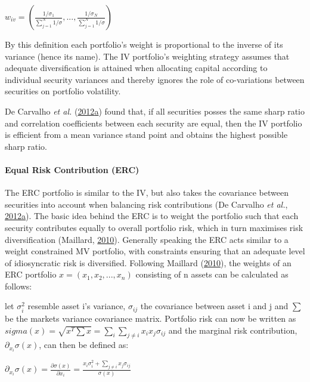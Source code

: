 \documentclass[11pt,preprint, authoryear]{elsarticle}
\numberwithin{equation}{section}
\numberwithin{figure}{section}
\numberwithin{table}{section}
\begin{document}
\begin{center} 
$w_{iv}=(\frac{1/\sigma_1}{\sum^N_{j=1} 1/\sigma}, ...,\frac{1/\sigma_N}{\sum^N_{j=1} 1/\sigma} )$ 
\end{center}

By this definition each portfolio's weight is proportional to the
inverse of its variance (hence its name). The IV portfolio's weighting
strategy assumes that adequate diversification is attained when
allocating capital according to individual security variances and
thereby ignores the role of co-variations between securities on
portfolio volatility.

De Carvalho \emph{et al.}
(\protect\hyperlink{ref-leote}{2012}\protect\hyperlink{ref-leote}{a})
found that, if all securities posses the same sharp ratio and
correlation coefficients between each security are equal, then the IV
portfolio is efficient from a mean variance stand point and obtains the
highest possible sharp ratio.

\hypertarget{equal-risk-contribution-erc}{%
\paragraph{Equal Risk Contribution
(ERC)}\label{equal-risk-contribution-erc}}

The ERC portfolio is similar to the IV, but also takes the covariance
between securities into account when balancing risk contributions (De
Carvalho \emph{et al.},
\protect\hyperlink{ref-leote}{2012}\protect\hyperlink{ref-leote}{a}).
The basic idea behind the ERC is to weight the portfolio such that each
security contributes equally to overall portfolio risk, which in turn
maximises risk diversification (Maillard,
\protect\hyperlink{ref-maillard2010}{2010}). Generally speaking the ERC
acts similar to a weight constrained MV portfolio, with constraints
ensuring that an adequate level of idiosyncratic risk is diversified.
Following Maillard (\protect\hyperlink{ref-maillard2010}{2010}), the
weights of an ERC portfolio \(x=(x_1,x_2,...,x_n)\) consisting of n
assets can be calculated as follows:

let \(\sigma_i^2\) resemble asset i's variance, \(\sigma_{ij}\) the
covariance between asset i and j and \(\sum\) be the markets variance
covariance matrix. Portfolio risk can now be written as
\(sigma(x)=\sqrt{x^T\sum x}=\sum_i\sum_{j\neq i}x_ix_j\sigma_{ij}\) and
the marginal risk contribution, \(\partial_{x_i}\sigma(x)\), can then be
defined as:

\begin{center}
$\partial_{x_i}\sigma(x)=\frac{\partial\sigma(x)}{\partial x_i}=\frac{x_i\sigma_i^2+\sum_{j\neq i}x_j\sigma_{ij}}{\sigma(x)}$ 
\end{center}
\end{document}

